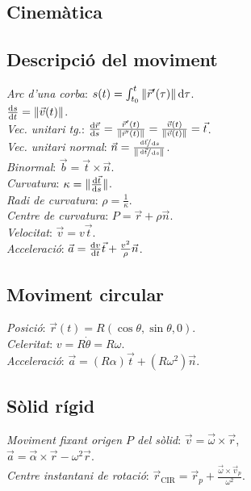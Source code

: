 \documentclass[11pt]{article}
\newcommand{\ci}{\textbullet\;}
\begin{document}
\ifland
\raggedright
\begin{multicols}{4}
\fi

\section{Cinem\`atica}

\subsection{Descripci\'o del moviment}
\emph{Arc d'una corba}: $s(t) = \int^t_{t_0} \|\vec{r}'(\tau)\| \dif\tau$. \\
\ci $\frac{\dif s}{\dif t} = \|\vec{v}(t)\|$. \\
\emph{Vec. unitari tg.}: $\frac{\dif \vec{r}}{\dif s} = \frac{\vec{r}'(t)}{\|\vec{r}'(t)\|} = \frac{\vec{v}(t)}{\|\vec{v}(t)\|} = \vec{t}$. \\
\emph{Vec. unitari normal}: $\vec{n} = \frac{\sfrac{\dif \vec{t}}{\dif s}}{\|\sfrac{\dif \vec{t}}{\dif s}\|}$. \\
\emph{Binormal}: $\vec{b} = \vec{t} \times \vec{n}$. \\
\emph{Curvatura}: $\kappa = \|\frac{\dif \vec{t}}{\dif s}\|$. \\
\emph{Radi de curvatura}: $\rho = \frac{1}{\kappa}$. \\
\emph{Centre de curvatura}: $P = \vec{r} + \rho\vec{n}$.\\
\emph{Velocitat}: $\vec{v} = v\vec{t}$. \\
\emph{Acceleraci\'o}: $\vec{a} = \frac{\dif v}{\dif t}\vec{t} + \frac{v^2}{\rho}\vec{n}$.

\subsection{Moviment circular}
\emph{Posici\'o}: $\vec{r}(t) = R(\cos \theta, \sin \theta, 0)$. \\
\emph{Celeritat}: $v = R\dot\theta = R\omega$. \\
\emph{Acceleraci\'o}: $\vec{a} = (R\alpha)\vec{t} + (R\omega^2)\vec{n}$.

\subsection{S\`olid r\'igid}
\emph{Moviment fixant origen $P$ del sòlid}: $\vec{v} = \vec{\omega} \times \vec{r}$,\\
$\vec{a} =  \vec{\alpha} \times \vec{r} - \omega^2 \vec{r}$.\\
\emph{Centre instantani de rotaci\'o}: $\vec{r}_{\text{CIR}} = \vec{r}_p + \frac{\vec{\omega} \times \vec{v}_p}{\omega^2}$.



\end{multicols}
\end{document}
